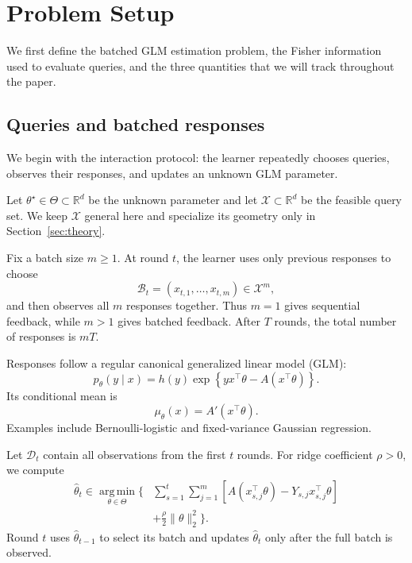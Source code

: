 \documentclass[10pt,twoside,letterpaper]{article}
\newcommand{\R}{\mathbb R}
\newcommand{\argmin}{\operatorname*{arg\,min}}
\newcommand{\norm}[1]{\lVert #1\rVert}
\newcommand{\thetahat}{\widehat\theta}
\begin{document}
\section{Problem Setup}
\label{sec:setup}

We first define the batched GLM estimation problem, the Fisher information
used to evaluate queries, and the three quantities that we will track
throughout the paper.

\subsection{Queries and batched responses}

We begin with the interaction protocol: the learner repeatedly chooses
queries, observes their responses, and updates an unknown GLM parameter.

Let $\theta^\star\in\Theta\subset\R^d$ be the unknown parameter and let
$\mathcal X\subset\R^d$ be the feasible query set. We keep
$\mathcal X$ general here and specialize its geometry only in
Section~\ref{sec:theory}.

Fix a batch size $m\ge1$. At round $t$, the learner uses only previous
responses to choose
\begin{equation}
\mathcal B_t
=
(x_{t,1},\ldots,x_{t,m})
\in\mathcal X^m,
\end{equation}
and then observes all $m$ responses together. Thus $m=1$ gives
sequential feedback, while $m>1$ gives batched feedback. After $T$
rounds, the total number of responses is $mT$.

Responses follow a regular canonical generalized linear model (GLM):
\begin{equation}
p_\theta(y\mid x)
=
h(y)\exp\!\left\{
yx^\top\theta-A(x^\top\theta)
\right\}.
\label{eq:glm}
\end{equation}
Its conditional mean is
\begin{equation}
\mu_\theta(x)=A'(x^\top\theta).
\label{eq:glm-mean}
\end{equation}
Examples include Bernoulli-logistic and fixed-variance Gaussian
regression.

Let $\mathcal D_t$ contain all observations from the first $t$ rounds.
For ridge coefficient $\rho>0$, we compute
\begin{equation}
\begin{split}
\thetahat_t
\in
\argmin_{\theta\in\Theta}
\Bigg\{&
\sum_{s=1}^{t}\sum_{j=1}^{m}
\left[
A(x_{s,j}^\top\theta)
-
Y_{s,j}x_{s,j}^\top\theta
\right]\\
&+
\frac{\rho}{2}\norm{\theta}_2^2
\Bigg\}.
\end{split}
\label{eq:mle}
\end{equation}
Round $t$ uses $\thetahat_{t-1}$ to select its batch and updates
$\thetahat_t$ only after the full batch is observed.
\end{document}
